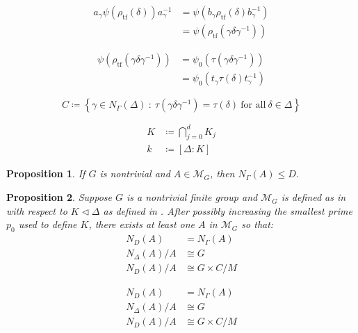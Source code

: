 \documentclass[10pt,a4paper]{amsart}
\newtheorem{prop}{Proposition}
\newcommand{\Del}{\Delta}
\newcommand{\Gam}{\Gamma}
\newcommand{\calM}{\mathcal{M}}
\newcommand{\de}{\delta}
\newcommand{\gam}{\gamma}
\begin{document}
\begin{align}
a_\gam \psi(\rho_{\mathrm{tf}}(\de)) a_\gam^{-1} &= \psi(b_\gam \rho_{\mathrm{tf}}(\de) b_\gam^{-1}) \nonumber \\
&= \psi(\rho_{\mathrm{tf}}(\gam \de \gam^{-1})) \label{eq:1stConj}
\end{align}

\begin{align}
\psi(\rho_{\mathrm{tf}}(\gam \de \gam^{-1})) &= \psi_0( \tau(\gam \de \gam^{-1})) \nonumber \\
&= \psi_0(t_\gam \tau(\de) t_\gam^{-1}) \label{eq:2ndConj}
\end{align}

\begin{equation}\label{eq:CDef}
C \coloneqq\!\left\{\gam \in N_\Gam(\Del)\ :\ \tau(\gam \de \gam^{-1}) = \tau (\de)\ \textrm{for all}\ \de \in \Del \right\}
\end{equation}

\begin{align}
K &\coloneqq \bigcap_{j = 0}^d K_j \label{eq:KDef} \\
k &\coloneqq [\Del : K] \label{eq:kDef}
\end{align}

\begin{prop}\label{prop:NormInD}
If $G$ is nontrivial and $A \in \calM_G$, then $N_\Gam(A) \le D$.
\end{prop}

\begin{prop}\label{prop:FindA}
Suppose $G$ is a nontrivial finite group and $\calM_G$ is defined as in  with respect to $K \triangleleft \Del$ as defined in . After possibly increasing the smallest prime $p_0$ used to define $K$, there exists at least one $A$ in $\calM_G$ so that:
\begin{align}
N_D(A) &= N_\Gam(A) \label{eq:ND=NGam} \\
N_\Del(A) / A &\cong G \label{eq:NDel(A)/A=G} \\
N_D(A) / A &\cong G \times C / M \label{eq:ND(A)/A}
\end{align}
\end{prop}

\begin{align}
N_D(A) &= N_\Gam(A)  \\
N_\Del(A) / A &\cong G  \\
N_D(A) / A &\cong G \times C / M 
\end{align}
\end{document}
